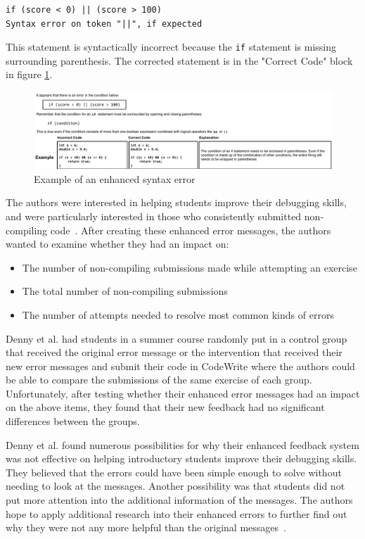\documentclass{sig-alternate}
\begin{document}
\begin{verbatim}
if (score < 0) || (score > 100)
Syntax error on token "||", if expected
\end{verbatim}

This statement is syntactically incorrect because the \texttt{if} statement is missing surrounding parenthesis. The corrected statement is in the "Correct Code" block in figure \ref{fig:ese}.

\begin{figure}
  \centering
  \includegraphics[keepaspectratio, width=\textwidth]{EnhancedSyntaxError.pdf}
  \caption{Example of an enhanced syntax error}
  \label{fig:ese}
\end{figure}

The authors were interested in helping students improve their debugging skills, and were particularly interested in those who consistently submitted non-compiling code~\cite{Denny:2014:ESE:2591708.2591748}.
After creating these enhanced error messages, the authors wanted to examine whether they had an impact on:
\begin{itemize}
	\item The number of non-compiling submissions made while attempting an exercise
	\item The total number of non-compiling submissions
	\item The number of attempts needed to resolve most common kinds of errors
\end{itemize}

Denny et al. had students in a summer course randomly put in a control group that received the original error message or the intervention that received their new error messages and submit their code in CodeWrite where the authors could be able to compare the submissions of the same exercise of each group.
Unfortunately, after testing whether their enhanced error messages had an impact on the above items, they found that their new feedback had no significant differences between the groups.

Denny et al. found numerous possibilities for why their enhanced feedback system was not effective on helping introductory students improve their debugging skills.
They believed that the errors could have been simple enough to solve without needing to look at the messages.
Another possibility was that students did not put more attention into the additional information of the messages.
The authors hope to apply additional research into their enhanced errors to further find out why they were not any more helpful than the original messages~\cite{Denny:2014:ESE:2591708.2591748}.
\end{document}
